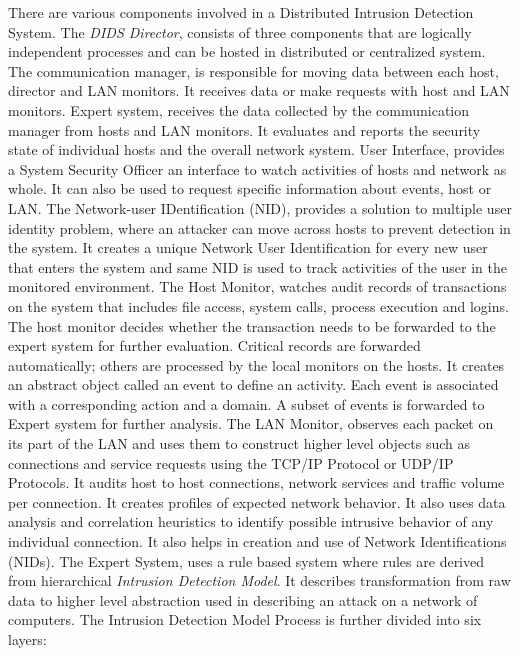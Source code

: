 \documentclass[11pt]{article}
\begin{document}
	There are various components involved in a Distributed Intrusion Detection System. The \textit{DIDS Director}, consists of three components that are logically independent processes and can be hosted in distributed or centralized system. The communication manager, is responsible for moving data between each host, director and LAN monitors. It receives data or make requests with host and LAN monitors. Expert system, receives the data collected by the communication manager from hosts and LAN monitors. It evaluates and reports the security state of individual hosts and the overall network system. User Interface, provides a System Security Officer an interface to watch activities of hosts and network as whole. It can also be used to request specific information about events, host or LAN. The Network-user IDentification (NID), provides a solution to multiple user identity problem, where an attacker can move across hosts to prevent detection in the system. It creates a unique Network User Identification for every new user that enters the system and same NID is used to track activities of the user in the monitored environment. The Host Monitor, watches audit records of transactions on the system that includes file access, system calls, process execution and logins. The host monitor decides whether the transaction needs to be forwarded to the expert system for further evaluation. Critical records are forwarded automatically; others are processed by the local monitors on the hosts. It creates an abstract object called an event to define an activity. Each event is associated with a corresponding action and a domain. A subset of events is forwarded to Expert system for further analysis. The LAN Monitor, observes each packet on its part of the LAN and uses them to construct higher level objects such as connections and service requests using the TCP/IP Protocol or UDP/IP Protocols. It audits host to host connections, network services and traffic volume per connection. It creates profiles of expected network behavior. It also uses data analysis and correlation heuristics to identify possible intrusive behavior of any individual connection. It also helps in creation and use of Network Identifications (NIDs). The Expert System, uses a rule based system where rules are derived from hierarchical \textit{Intrusion Detection Model}. It describes transformation from raw data to higher level abstraction used in describing an attack on a network of computers. The Intrusion Detection Model Process is further divided into six layers:
\end{document}
